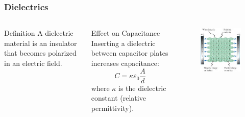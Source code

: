 \documentclass{beamer}
\begin{document}
\begin{frame}
    \frametitle{Dielectrics}
    \begin{columns}
        \begin{block}{Definition}
            A dielectric material is an insulator that becomes polarized in an electric field.
        \end{block}
        
        \begin{block}{Effect on Capacitance}
            Inserting a dielectric between capacitor plates increases capacitance:
            \begin{equation}
                C = \kappa \varepsilon_0 \frac{A}{d}
            \end{equation}
            where $\kappa$ is the dielectric constant (relative permittivity).
        \end{block}
        
        \begin{alertblock}{ }
           \begin{figure}
               \centering
               \includegraphics[width=1\linewidth]{phys11-electrostatics-capacitor-with-dielectric.png}
           \end{figure}
        \end{alertblock}
    \end{columns}
\end{frame}
\end{document}
